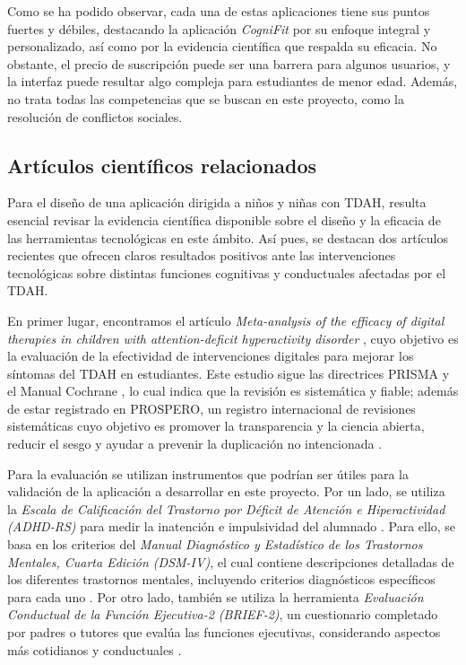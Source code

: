 Como se ha podido observar, cada una de estas aplicaciones tiene sus puntos fuertes y débiles, destacando la aplicación \textit{CogniFit} por su enfoque integral y personalizado, así como por la evidencia científica que respalda su eficacia.
No obstante, el precio de suscripción puede ser una barrera para algunos usuarios, y la interfaz puede resultar algo compleja para estudiantes de menor edad.
Además, no trata todas las competencias que se buscan en este proyecto, como la resolución de conflictos sociales.

\subsection{Artículos científicos relacionados}
Para el diseño de una aplicación dirigida a niños y niñas con TDAH, resulta esencial revisar la evidencia científica disponible sobre el diseño y la eficacia de las herramientas tecnológicas en este ámbito. 
Así pues, se destacan dos artículos recientes que ofrecen claros resultados positivos ante las intervenciones tecnológicas sobre distintas funciones cognitivas y conductuales afectadas por el TDAH.

En primer lugar, encontramos el artículo \textit{Meta-analysis of the efficacy of digital therapies in children with attention-deficit hyperactivity disorder} \parencite{tech_interventions_tdah}, cuyo objetivo es la evaluación de la efectividad de intervenciones digitales para mejorar los síntomas del TDAH en estudiantes. 
Este estudio sigue las directrices PRISMA y el Manual Cochrane \parencite{prisma}, lo cual indica que la revisión es sistemática y fiable; además de estar registrado en PROSPERO, un registro internacional de revisiones sistemáticas cuyo objetivo es promover la transparencia y la ciencia abierta, reducir el sesgo y ayudar a prevenir la duplicación no intencionada \parencite{prospero}.

\newpage
Para la evaluación se utilizan instrumentos que podrían ser útiles para la validación de la aplicación a desarrollar en este proyecto. 
Por un lado, se utiliza la \textit{Escala de Calificación del Trastorno por Déficit de Atención e Hiperactividad (ADHD-RS)} para medir la inatención e impulsividad del alumnado \parencite{adhdrs}. 
Para ello, se basa en los criterios del \textit{Manual Diagnóstico y Estadístico de los Trastornos Mentales, Cuarta Edición (DSM-IV)}, el cual contiene descripciones detalladas de los diferentes trastornos mentales, incluyendo criterios diagnósticos específicos para cada uno \parencite{dsmiv}. 
Por otro lado, también se utiliza la herramienta \textit{Evaluación Conductual de la Función Ejecutiva-2 (BRIEF-2)}, un cuestionario completado por padres o tutores que evalúa las funciones ejecutivas, considerando aspectos más cotidianos y conductuales \parencite{brief2}.

